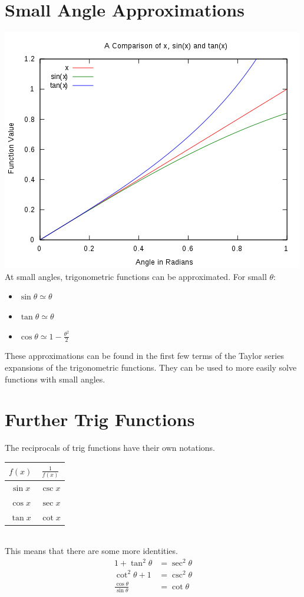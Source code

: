 \documentclass[a4paper,12pt]{article}
\begin{document}
\section*{Small Angle Approximations}
\includegraphics[scale=0.5]{Graph1} \\
At small angles, trigonometric functions can be approximated. For small $\theta$:
\begin{itemize}
	\item $\sin \theta \simeq \theta$
	\item $\tan \theta \simeq \theta$
	\item $\cos \theta \simeq 1 - \frac{\theta^2}{2}$
\end{itemize}
These approximations can be found in the first few terms of the Taylor series expansions of the trigonometric functions. They can be used to more easily solve functions with small angles. 
\section*{Further Trig Functions}
The reciprocals of trig functions have their own notations. \\
\begin{tabular}{ c c }
\hline
	 $f(x)$ & $\frac{1}{f(x)}$  \\ 
\hline
	$\sin x$ & $\csc x$ \\
	$\cos x$ & $\sec x$ \\
	$\tan x$ & $\cot x$ \\
\hline
\end{tabular}
\\
This means that there are some more identities. 
\begin{align*}
1 + \tan^2 \theta & = \sec^2 \theta \\
\cot^2 \theta + 1 & = \csc^2 \theta \\
\frac{\cos \theta}{\sin \theta} & = \cot \theta \\
\end{align*}
\end{document}
